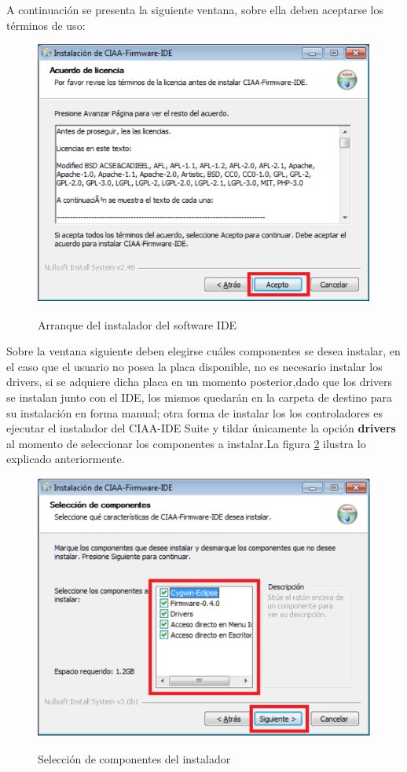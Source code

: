 \documentclass[12pt,letterpaper]{article}
\begin{document}
A continuación se presenta la siguiente ventana, sobre ella deben aceptarse los términos de uso:

\begin{figure}[!h]
\centering
\includegraphics[width=8 cm]{figuras/instalacion2.png}\\
\caption{Arranque del instalador del software IDE}
\label{Fig4}
\end{figure}


Sobre la ventana siguiente deben elegirse cuáles componentes se desea instalar, en el caso que el usuario no posea  la placa disponible, no es necesario instalar los drivers, si se adquiere dicha placa en un momento posterior,dado que los drivers se instalan junto con el IDE, los mismos quedarán en la carpeta de destino para su instalación en forma manual; otra forma de instalar los  los controladores es ejecutar el instalador del CIAA-IDE Suite y tildar únicamente la opción \textbf{drivers} al momento de seleccionar los componentes a instalar.La figura \ref{Fig5} ilustra lo explicado anteriormente.

\begin{center}
\begin{figure}[!h]
\centering
\includegraphics[width=8 cm]{figuras/instalacion3.png}\\
\caption{Selección de componentes del instalador}
\label{Fig5}
\end{figure}
\end{center}
\end{document}
